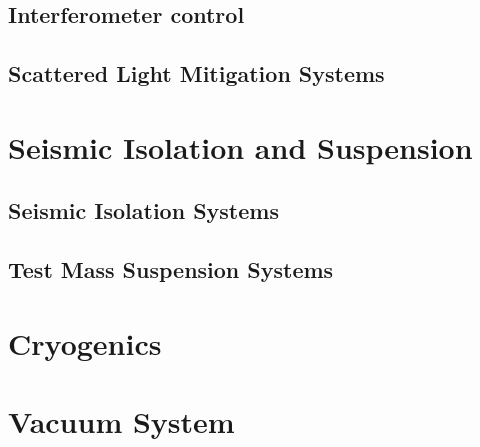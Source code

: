 \subsection{Interferometer control}



\subsection{Scattered Light Mitigation Systems}



\FloatBarrier
\section{Seismic Isolation and Suspension}
\label{Sec:SASandSUS}

\subsection{Seismic Isolation Systems}
\label{Sec:SAS}


\subsection{Test Mass Suspension Systems}
\label{Sec:SUS}

\FloatBarrier

\section{Cryogenics}
\label{Sec:Cryogenics}



\section{Vacuum System}
\label{Sec:Vacuum}


